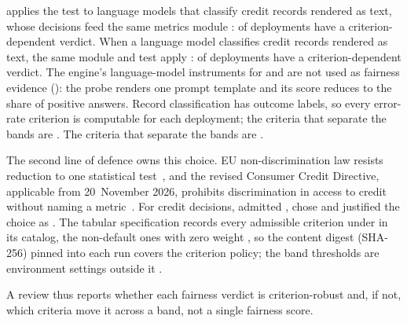 \ifarmwithdrawn
{} applies the test to language models that classify credit records rendered as text, whose decisions feed the same metrics module :  of  deployments have a criterion-dependent verdict.
\else
When a language model classifies credit records rendered as text, the same module and test apply :  of  deployments have a criterion-dependent verdict.
\fi
The engine's language-model instruments for  and  are not used as fairness evidence (): the  probe renders one prompt template and its score reduces to the share of positive answers.
\ifarmreduced
Record classification has outcome labels, so every error-rate criterion is computable for each deployment; the criteria that separate the bands are .
\fi
\ifarmwithdrawn
The criteria that separate the bands are .
\fi

The second line of defence owns this choice.
EU non-discrimination law resists reduction to one statistical test~\cite{wachter2021fairness}, and the revised Consumer Credit Directive, applicable from 20~November 2026, prohibits discrimination in access to credit without naming a metric~\cite{euccd2023}.
For credit decisions, \legalrisk{} admitted , chose  and justified the choice as .
The tabular specification records every admissible criterion under  in its catalog, the non-default ones with zero weight , so the content digest (SHA-256) pinned into each run covers the criterion policy; the band thresholds are environment settings outside it .

A review thus reports whether each fairness verdict is criterion-robust and, if not, which criteria move it across a band, not a single fairness score.
